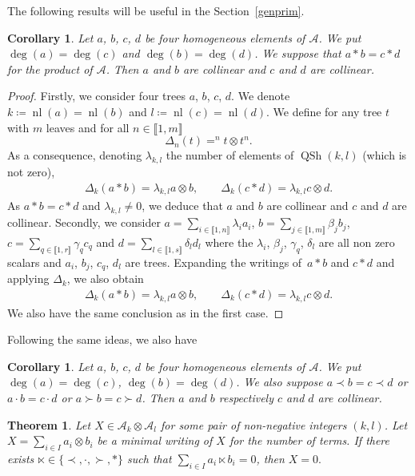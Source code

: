 \documentclass[10pt,a4paper]{amsart}
\numberwithin{equation}{section}
\theoremstyle{definition}
\theoremstyle{plain}
\newtheorem{Cor}[defi]{Corollary}
\newtheorem{thm}[defi]{Theorem}
\newcommand{\IEM}[2]{\llbracket #1,#2 \rrbracket}
\DeclareMathOperator{\batc}{QSh}
\DeclareMathOperator{\nf}{nl}
\begin{document}
The following results will be useful in the Section~\ref{genprim}.

\begin{Cor}%
Let $a$, $b$, $c$, $d$ be four homogeneous elements of $\mathcal{A}$. We put $\deg(a)=\deg(c)$ and $\deg(b)=\deg(d)$. We suppose that $a*b=c*d$ for the product of $\mathcal{A}$. Then $a$ and $b$ are collinear and $c$ and $d$ are collinear.
\end{Cor}
\begin{proof}
Firstly, we consider four trees $a$, $b$, $c$, $d$. We denote $k\coloneqq\nf(a)=\nf(b)$ and $l\coloneqq\nf(c)=\nf(d)$. We define for any tree $t$ with $m$ leaves and for all $n\in\IEM{1}{m}$
\[
\Delta_n(t)=^nt\otimes t^n.
\]
As a consequence, denoting $\lambda_{k,l}$ the number of elements of $\batc(k,l)$ (which is not zero),
\begin{gather*}
	\Delta_k(a*b)=\lambda_{k,l}a\otimes b, \qquad \Delta_{k}(c*d)=\lambda_{k,l}c\otimes d.
\end{gather*}
As $a*b=c*d$ and $\lambda_{k,l}\neq 0$, we deduce that $a$ and $b$ are collinear and $c$ and $d$ are collinear.
Secondly, we consider $a= \sum_{i\in\IEM{1}{n}} \lambda_i a_i$, $b= \sum_{j\in\IEM{1}{m}} \beta_j b_j$, $c= \sum_{q\in\IEM{1}{r}} \gamma_q c_q$ and $d= \sum_{l\in\IEM{1}{s}} \delta_l d_l$ where the $\lambda_i$, $\beta_j$, $\gamma_q$, $\delta_l$ are all non zero scalars and $a_i$, $b_j$, $c_q$, $d_l$ are trees. Expanding the writings of~$a*b$ and $c*d$ and applying $\Delta_k$, we also obtain
\begin{gather*}
	\Delta_k(a*b)=\lambda_{k,l}a\otimes b, \qquad \Delta_{k}(c*d)=\lambda_{k,l}c\otimes d.
\end{gather*}
We also have the same conclusion as in the first case.
\end{proof}

Following the same ideas, we also have
\begin{Cor}%
		Let $a$, $b$, $c$, $d$ be four homogeneous elements of $\mathcal{A}$. We put $\deg(a)=\deg(c)$, $\deg(b)=\deg(d)$. We also suppose $a\prec b=c\prec d$ or $a\cdot b=c\cdot d$ or $a\succ b=c\succ d$.
	Then $a$ and $b$ respectively $c$ and $d$ are collinear.
\end{Cor}

\begin{thm}
	\label{thm:inthom}
	Let $X\in \mathcal{A}_k\otimes \mathcal{A}_l$ for some pair of non-negative integers $(k,l)$. Let $X= \sum_{i\in I} a_i\otimes b_i$ be a minimal writing of $X$ for the number of terms. If there exists $\ltimes\in\{\prec,\cdot,\succ,*\}$ such that $ \sum_{i\in I} a_i\ltimes b_i=0$, then $X=0.$
\end{thm}
\end{document}

